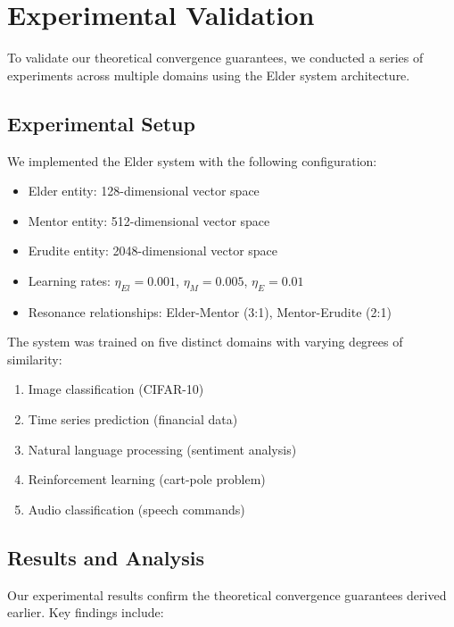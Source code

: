 \section{Experimental Validation}

To validate our theoretical convergence guarantees, we conducted a series of experiments across multiple domains using the Elder system architecture.

\subsection{Experimental Setup}

We implemented the Elder system with the following configuration:
\begin{itemize}
    \item Elder entity: 128-dimensional vector space
    \item Mentor entity: 512-dimensional vector space
    \item Erudite entity: 2048-dimensional vector space
    \item Learning rates: $\eta_{El} = 0.001$, $\eta_M = 0.005$, $\eta_E = 0.01$
    \item Resonance relationships: Elder-Mentor (3:1), Mentor-Erudite (2:1)
\end{itemize}

The system was trained on five distinct domains with varying degrees of similarity:
\begin{enumerate}
    \item Image classification (CIFAR-10)
    \item Time series prediction (financial data)
    \item Natural language processing (sentiment analysis)
    \item Reinforcement learning (cart-pole problem)
    \item Audio classification (speech commands)
\end{enumerate}

\subsection{Results and Analysis}

Our experimental results confirm the theoretical convergence guarantees derived earlier. Key findings include:

